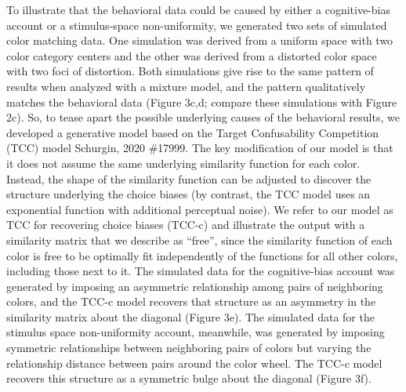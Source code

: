 To illustrate that the behavioral data could be caused by either a cognitive-bias account or a stimulus-space non-uniformity, we generated two sets of simulated color matching data. One simulation was derived from a uniform space with two color category centers and the other was derived from a distorted color space with two foci of distortion. Both simulations give rise to the same pattern of results when analyzed with a mixture model, and the pattern qualitatively matches the behavioral data (Figure 3c,d; compare these simulations with Figure 2c). So, to tease apart the possible underlying causes of the behavioral results, we developed a generative model based on the Target Confusability Competition (TCC) model {Schurgin, 2020 \#17999}. The key modification of our model is that it does not assume the same underlying similarity function for each color. Instead, the shape of the similarity function can be adjusted to discover the structure underlying the choice biases (by contrast, the TCC model uses an exponential function with additional perceptual noise). We refer to our model as TCC for recovering choice biases (TCC-c) and illustrate the output with a similarity matrix that we describe as “free”, since the similarity function of each color is free to be optimally fit independently of the functions for all other colors, including those next to it. The simulated data for the cognitive-bias account was generated by imposing an asymmetric relationship among pairs of neighboring colors, and the TCC-c model recovers that structure as an asymmetry in the similarity matrix about the diagonal (Figure 3e). The simulated data for the stimulus space non-uniformity account, meanwhile, was generated by imposing symmetric relationships between neighboring pairs of colors but varying the relationship distance between pairs around the color wheel. The TCC-c model recovers this structure as a symmetric bulge about the diagonal (Figure 3f). 

